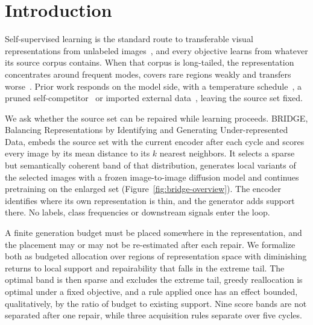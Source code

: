\documentclass{article}
\newcommand{\method}{BRIDGE}
\begin{document}
\section{Introduction}
Self-supervised learning is the standard route to transferable visual representations from unlabeled images~\citep{chen2020simple,he2020momentum,DINO,he2022masked,oquab2023dinov2,dinov3}, and every objective learns from whatever its source corpus contains. When that corpus is long-tailed, the representation concentrates around frequent modes, covers rare regions weakly and transfers worse~\citep{tian2021divide,assran2210hidden,ts,sdclr}. Prior work responds on the model side, with a temperature schedule~\citep{ts}, a pruned self-competitor~\citep{sdclr} or imported external data~\citep{colt}, leaving the source set fixed.

We ask whether the source set can be repaired while learning proceeds. \method, Balancing Representations by Identifying and Generating Under-represented Data, embeds the source set with the current encoder after each cycle and scores every image by its mean distance to its $k$ nearest neighbors. It selects a sparse but semantically coherent band of that distribution, generates local variants of the selected images with a frozen image-to-image diffusion model and continues pretraining on the enlarged set (Figure~\ref{fig:bridge-overview}). The encoder identifies where its own representation is thin, and the generator adds support there. No labels, class frequencies or downstream signals enter the loop.

A finite generation budget must be placed somewhere in the representation, and the placement may or may not be re-estimated after each repair. We formalize both as budgeted allocation over regions of representation space with diminishing returns to local support and repairability that falls in the extreme tail. The optimal band is then sparse and excludes the extreme tail, greedy reallocation is optimal under a fixed objective, and a rule applied once has an effect bounded, qualitatively, by the ratio of budget to existing support. Nine score bands are not separated after one repair, while three acquisition rules separate over five cycles.
\end{document}
